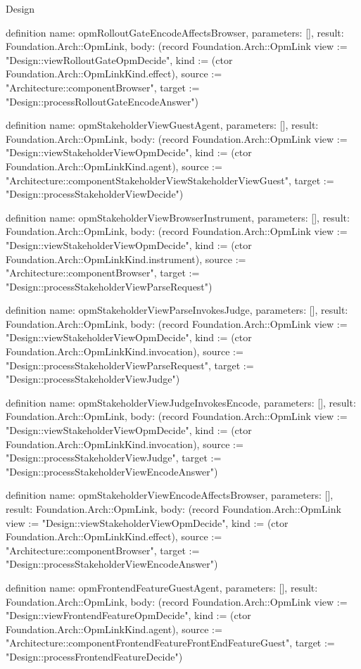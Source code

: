 \begin{lexlean}{Design}
\begin{semanticmodule}
definition{
  name: opmRolloutGateEncodeAffectsBrowser,
  parameters: [],
  result: Foundation.Arch::OpmLink,
  body: (record Foundation.Arch::OpmLink {view := "Design::viewRolloutGateOpmDecide", kind := (ctor Foundation.Arch::OpmLinkKind.effect), source := "Architecture::componentBrowser", target := "Design::processRolloutGateEncodeAnswer"})
}

definition{
  name: opmStakeholderViewGuestAgent,
  parameters: [],
  result: Foundation.Arch::OpmLink,
  body: (record Foundation.Arch::OpmLink {view := "Design::viewStakeholderViewOpmDecide", kind := (ctor Foundation.Arch::OpmLinkKind.agent), source := "Architecture::componentStakeholderViewStakeholderViewGuest", target := "Design::processStakeholderViewDecide"})
}

definition{
  name: opmStakeholderViewBrowserInstrument,
  parameters: [],
  result: Foundation.Arch::OpmLink,
  body: (record Foundation.Arch::OpmLink {view := "Design::viewStakeholderViewOpmDecide", kind := (ctor Foundation.Arch::OpmLinkKind.instrument), source := "Architecture::componentBrowser", target := "Design::processStakeholderViewParseRequest"})
}

definition{
  name: opmStakeholderViewParseInvokesJudge,
  parameters: [],
  result: Foundation.Arch::OpmLink,
  body: (record Foundation.Arch::OpmLink {view := "Design::viewStakeholderViewOpmDecide", kind := (ctor Foundation.Arch::OpmLinkKind.invocation), source := "Design::processStakeholderViewParseRequest", target := "Design::processStakeholderViewJudge"})
}

definition{
  name: opmStakeholderViewJudgeInvokesEncode,
  parameters: [],
  result: Foundation.Arch::OpmLink,
  body: (record Foundation.Arch::OpmLink {view := "Design::viewStakeholderViewOpmDecide", kind := (ctor Foundation.Arch::OpmLinkKind.invocation), source := "Design::processStakeholderViewJudge", target := "Design::processStakeholderViewEncodeAnswer"})
}

definition{
  name: opmStakeholderViewEncodeAffectsBrowser,
  parameters: [],
  result: Foundation.Arch::OpmLink,
  body: (record Foundation.Arch::OpmLink {view := "Design::viewStakeholderViewOpmDecide", kind := (ctor Foundation.Arch::OpmLinkKind.effect), source := "Architecture::componentBrowser", target := "Design::processStakeholderViewEncodeAnswer"})
}

definition{
  name: opmFrontendFeatureGuestAgent,
  parameters: [],
  result: Foundation.Arch::OpmLink,
  body: (record Foundation.Arch::OpmLink {view := "Design::viewFrontendFeatureOpmDecide", kind := (ctor Foundation.Arch::OpmLinkKind.agent), source := "Architecture::componentFrontendFeatureFrontEndFeatureGuest", target := "Design::processFrontendFeatureDecide"})
}


\end{semanticmodule}
\end{lexlean}
